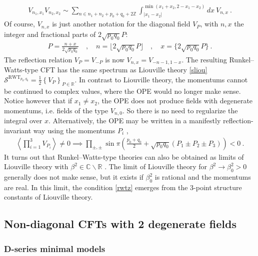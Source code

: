 \documentclass[12pt, a4paper]{article}
\begin{document}
\begin{align}
 \boxed{V_{n_1,x_1}V_{n_2,x_2} \sim \sum_{n\in n_1+n_2+p_0+q_0+2\mathbb{Z}}
\int_{|x_1-x_2|}^{\min (x_1+x_2,2-x_1-x_2)} dx\ V_{n, x}}\ .
\end{align}
Of course, $V_{n,x}$ is just another notation for the diagonal field $V_P$, with $n,x$ the integer and fractional parts of $2\sqrt{p_0q_0}P$:
\begin{align}
 P=\frac{n+x}{2\sqrt{p_0q_0}} \quad , \quad n=\Big\lfloor 2\sqrt{p_0q_0}P \Big\rfloor \quad , \quad x = \Big\{2\sqrt{p_0q_0}P \Big\}\ .
\end{align}
The reflection relation $V_P=V_{-P}$ is now $V_{n,x}=V_{-n-1,1-x}$. 
The resulting Runkel--Watts-type CFT has the same spectrum as Liouville theory \eqref{sliou} $
 \mathcal{S}^{\text{RWT}_{p_0,q_0}} = \frac12 \left\{ V_P\right\}_{P\in \mathbb{R}}$. In contrast to Liouville theory, the momentums cannot be continued to complex values, where the OPE would no longer make sense. Notice however that if $x_1\neq x_2$, the OPE does not produce fields with degenerate momentums, i.e. fields of the type $V_{n,0}$. So there is no need to regularize the integral over $x$. Alternatively, the OPE may be written in a manifestly reflection-invariant way using the momentums $P_i$ \cite{rs15},
 \begin{align}
  \left<\prod_{i=1}^3 V_{P_i}\right>\neq 0 \implies \prod_{\pm,\pm} \sin\pi\left(\tfrac{p_0+q_0}{2}+\sqrt{p_0q_0}(P_1\pm P_2\pm P_3)\right) < 0 \ .
  \label{rwtz}
 \end{align}
It turns out that Runkel--Watts-type theories can also be obtained as limits of Liouville theory with $\beta^2\in \mathbb{C}\backslash \mathbb{R}$ \cite{sch03, mce07}. The limit of Liouville theory for $\beta^2\to \beta_0^2>0$ generally does not make sense, but it exists if $\beta_0^2$ is rational and the momentums are real. In this limit, the condition \eqref{rwtz} emerges from the 3-point structure constants of Liouville theory. 


\subsection{Non-diagonal CFTs with 2 degenerate fields}

\subsubsection{D-series minimal models}
\end{document}
